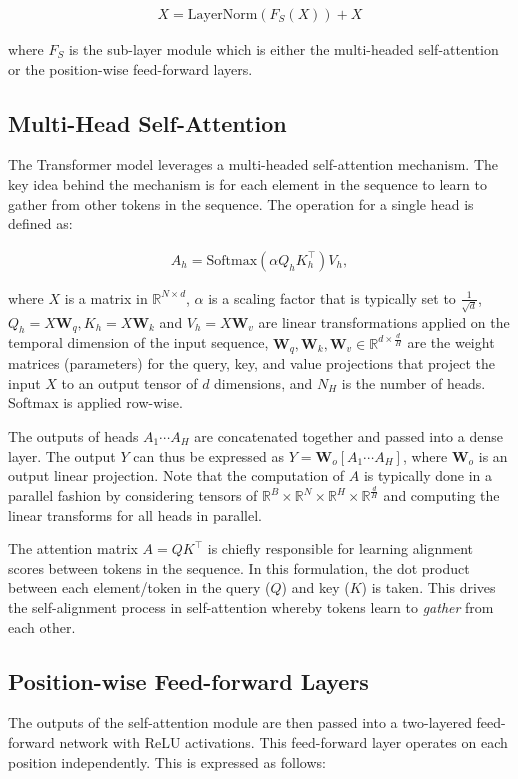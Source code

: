 \begin{align*}
X = \text{LayerNorm}(F_S(X)) + X    
\end{align*}

where $F_S$ is the sub-layer module which is either the multi-headed self-attention or the position-wise feed-forward layers.

\subsection{Multi-Head Self-Attention} The Transformer model leverages a multi-headed self-attention mechanism. The key idea behind the mechanism is for each element in the sequence to learn to gather from other tokens in the sequence. The operation for a single head is defined as:

\begin{align*}
A_h =  \text{Softmax}(\alpha Q_hK_h^\top)V_h, 
\end{align*}

where $X$ is a matrix in $\mathbb{R}^{N \times d}$, $\alpha$ is a scaling factor that is typically set to $\frac{1}{\sqrt{d}}$, $Q_h=X\bm{W}_q, K_h=X\bm{W}_k$ and $V_h=X\bm{W}_v$ are linear transformations applied on the temporal dimension of the input sequence, $\bm{W}_q, \bm{W}_k, \bm{W}_v \in \mathbb{R}^{d \times \frac{d}{H}}$ are the weight matrices (parameters) for the query, key, and value projections that project the input $X$ to an output tensor of $d$ dimensions, and $N_H$ is the number of heads. Softmax is applied row-wise.

The outputs of heads $A_1 \cdots A_{H}$ are concatenated together and passed into a dense layer. The output $Y$ can thus be expressed as $Y = \bm{W}_o[A_1 \cdots A_{H}]$,  where $\bm{W}_{o}$ is an output linear projection. Note that the computation of $A$ is typically done in a parallel fashion by considering tensors of $\mathbb{R}^B \times \mathbb{R}^N \times \mathbb{R}^{H}  \times \mathbb{R}^{\frac{d}{H}}$ and computing the linear transforms for all heads in parallel.

The attention matrix $A=QK^\top$ is chiefly responsible for learning alignment scores between tokens in the sequence. In this formulation, the dot product between each element/token in the query ($Q$) and key ($K$) is taken. This drives the self-alignment process in self-attention whereby tokens learn to \textit{gather} from each other.

\subsection{Position-wise Feed-forward Layers} The outputs of the self-attention module are then passed into a two-layered feed-forward network with ReLU activations. This feed-forward layer operates on each position independently. This is expressed as follows:


